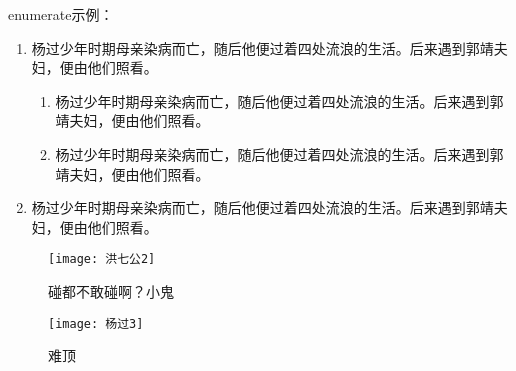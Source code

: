 \documentclass[doctor, vlined]{DissertUESTC}
\begin{document}
	\null

	enumerate示例：

	\begin{enumerate}
		\item 杨过少年时期母亲染病而亡，随后他便过着四处流浪的生活。后来遇到郭靖夫妇，便由他们照看。
		\begin{enumerate}
			\item 杨过少年时期母亲染病而亡，随后他便过着四处流浪的生活。后来遇到郭靖夫妇，便由他们照看。
			\item 杨过少年时期母亲染病而亡，随后他便过着四处流浪的生活。后来遇到郭靖夫妇，便由他们照看。
		\end{enumerate}
		\item 杨过少年时期母亲染病而亡，随后他便过着四处流浪的生活。后来遇到郭靖夫妇，便由他们照看。
	\end{enumerate}
	

	\begin{figure}[!htb]
		\centering
		\texttt{[image: 洪七公2]}
		\captionsetup{list=no}%
		\caption{碰都不敢碰啊？小鬼}
	\end{figure}
	
	\begin{figure}[!htb]
		\centering
		\texttt{[image: 杨过3]}
		\captionsetup{list=no}%
		\caption{难顶}
	\end{figure}
\end{document}
